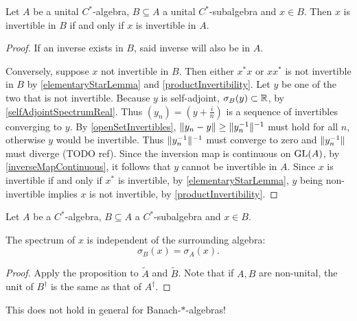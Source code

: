 \begin{proposition}
Let $A$ be a unital $C^*$-algebra, $B\subseteq A$ a unital $C^*$-subalgebra and $x\in B$. Then $x$ is invertible in $B$ \textup{if and only if} $x$ is invertible in $A$.
\end{proposition}
\begin{proof}
If an inverse exists in $B$, said inverse will also be in $A$.

Conversely, suppose $x$ not invertible in $B$. Then either $x^*x$ or $xx^*$ is not invertible in $B$ by \ref{elementaryStarLemma} and \ref{productInvertibility}. Let $y$ be one of the two that is not invertible. Because $y$ is self-adjoint, $\sigma_B(y)\subset \mathbb{R}$, by \ref{selfAdjointSpectrumReal}. Thus $(y_n) = (y+\frac{i}{n})$ is a sequence of invertibles converging to $y$. By \ref{openSetInvertibles}, $\lVert y_n - y\rVert\geq \lVert y_n^{-1}\rVert^{-1}$ must hold for all $n$, otherwise $y$ would be invertible. Thus $\lVert y_n^{-1}\rVert^{-1}$ must converge to zero and $\lVert y_n^{-1}\rVert$ must diverge (TODO ref). Since the inversion map is continuous on $\operatorname{GL}(A)$, by \ref{inverseMapContinuous}, it follows that $y$ cannot be invertible in $A$. Since $x$ is invertible if and only if $x^*$ is invertible, by \ref{elementaryStarLemma}, $y$ being non-invertible implies $x$ is not invertible, by \ref{productInvertibility}.
\end{proof}
\begin{corollary} \label{spectrumIndependentOfSurroundingAlgebra}
Let $A$ be a $C^*$-algebra, $B\subseteq A$ a $C^*$-subalgebra and $x\in B$.

The spectrum of $x$ is independent of the surrounding algebra:
\[ \sigma_B(x) = \sigma_A(x). \]
\end{corollary}
\begin{proof}
Apply the proposition to $\tilde{A}$ and $\tilde{B}$. Note that if $A,B$ are non-unital, the unit of $B^\dagger$ is the same as that of $A^\dagger$.
\end{proof}
This does not hold in general for Banach-$*$-algebras!


